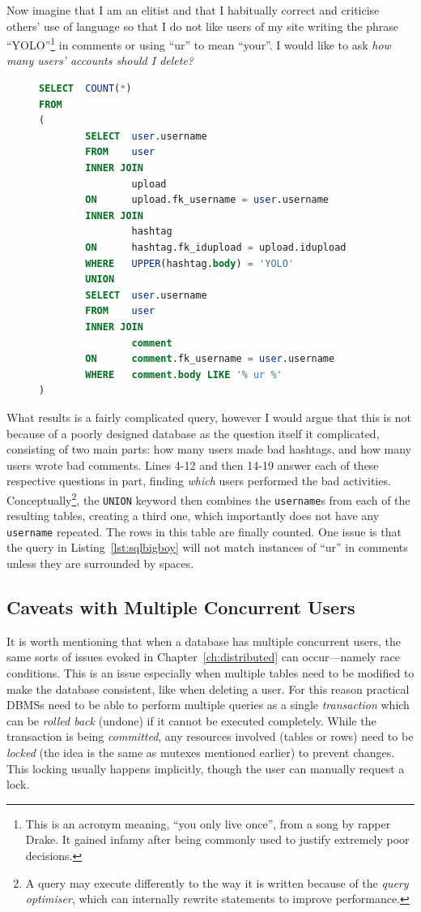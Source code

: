 \documentclass[11pt,a4paper]{report}
\begin{document}
	Now imagine that I am an elitist and that I habitually correct and criticise others' use of language so that I do not like users of my site writing the phrase ``YOLO''\footnote{This is an acronym meaning, ``you only live once'', from a song by rapper Drake. It gained infamy after being commonly used to justify extremely poor decisions.} in comments or using ``ur'' to mean ``your''. I would like to ask \textit{how many users' accounts should I delete?}
	\begin{figure}
	\begin{lstlisting}[language=SQL, caption={An example showing the use of nested queries, aggregate functions and SQL joins.}, label=lst:sqlbigboy]
SELECT	COUNT(*)
FROM
(
		SELECT	user.username
		FROM	user
		INNER JOIN
				upload
		ON		upload.fk_username = user.username
		INNER JOIN
				hashtag
		ON		hashtag.fk_idupload = upload.idupload
		WHERE	UPPER(hashtag.body) = 'YOLO'
		UNION
		SELECT	user.username
		FROM	user
		INNER JOIN
				comment
		ON		comment.fk_username = user.username
		WHERE	comment.body LIKE '% ur %'
)
	\end{lstlisting}
	\end{figure}
	What results is a fairly complicated query, however I would argue that this is not because of a poorly designed database as the question itself it complicated, consisting of two main parts: how many users made bad hashtags, and how many users wrote bad comments. Lines 4-12 and then 14-19 answer each of these respective questions in part, finding \textit{which} users performed the bad activities. Conceptually\footnote{A query may execute differently to the way it is written because of the \textit{query optimiser}, which can internally rewrite statements to improve performance.}, the \verb|UNION| keyword then combines the \verb|username|s from each of the resulting tables, creating a third one, which importantly does not have any \verb|username| repeated. The rows in this table are finally counted. One issue is that the query in Listing~\ref{lst:sqlbigboy} will not match instances of ``ur'' in comments unless they are surrounded by spaces.
	
	\subsection{Caveats with Multiple Concurrent Users}
	It is worth mentioning that when a database has multiple concurrent users, the same sorts of issues evoked in Chapter~\ref{ch:distributed} can occur---namely race conditions. This is an issue especially when multiple tables need to be modified to make the database consistent, like when deleting a {\sc user}. For this reason practical DBMSs need to be able to perform multiple queries as a single \textit{transaction} which can be \textit{rolled back} (undone) if it cannot be executed completely. While the transaction is being \textit{committed}, any resources involved (tables or rows) need to be \textit{locked} (the idea is the same as mutexes mentioned earlier) to prevent changes. This locking usually happens implicitly, though the user can manually request a lock.
	
\end{document}
